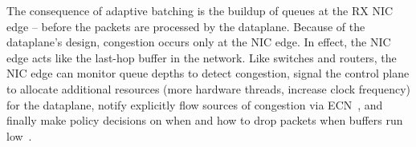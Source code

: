 
The consequence of adaptive batching is the buildup of queues at the
RX NIC edge -- before the packets are processed by the dataplane.
Because of the dataplane's design, congestion occurs only at the NIC
edge.  
In effect, the NIC edge acts like the last-hop
buffer in the network.  Like switches and routers, the NIC edge can
monitor queue depths to detect congestion, signal the control plane to
allocate additional resources (more hardware threads, increase clock
frequency) for the dataplane, notify explicitly flow sources of
congestion via ECN~\cite{ramakrishnan2001addition}, and finally make
policy decisions on when and how to drop packets when buffers run
low~\cite{DBLP:journals/ton/FloydJ93}.
